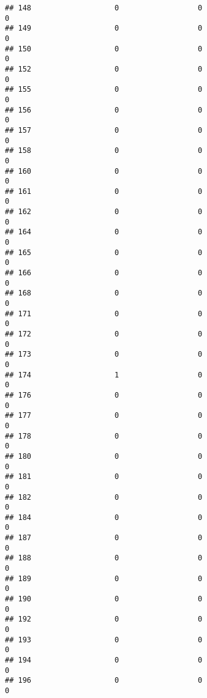 \documentclass[
]{article}
\begin{document}
\begin{verbatim}
## 148                   0                  0                              0
## 149                   0                  0                              0
## 150                   0                  0                              0
## 152                   0                  0                              0
## 155                   0                  0                              0
## 156                   0                  0                              0
## 157                   0                  0                              0
## 158                   0                  0                              0
## 160                   0                  0                              0
## 161                   0                  0                              0
## 162                   0                  0                              0
## 164                   0                  0                              0
## 165                   0                  0                              0
## 166                   0                  0                              0
## 168                   0                  0                              0
## 171                   0                  0                              0
## 172                   0                  0                              0
## 173                   0                  0                              0
## 174                   1                  0                              0
## 176                   0                  0                              0
## 177                   0                  0                              0
## 178                   0                  0                              0
## 180                   0                  0                              0
## 181                   0                  0                              0
## 182                   0                  0                              0
## 184                   0                  0                              0
## 187                   0                  0                              0
## 188                   0                  0                              0
## 189                   0                  0                              0
## 190                   0                  0                              0
## 192                   0                  0                              0
## 193                   0                  0                              0
## 194                   0                  0                              0
## 196                   0                  0                              0

\end{verbatim}
\end{document}
